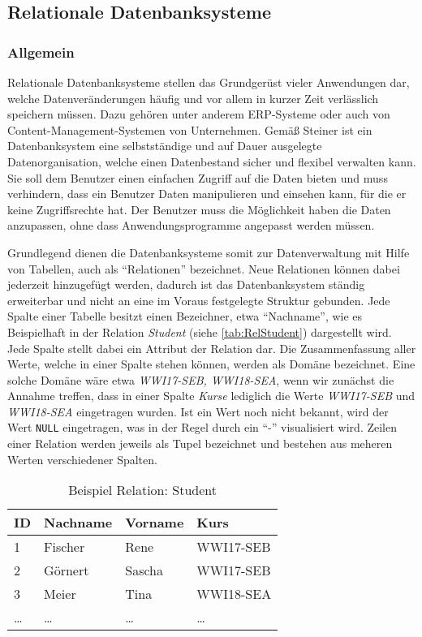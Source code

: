 \subsection{Relationale Datenbanksysteme}

\subsubsection{Allgemein}

Relationale Datenbanksysteme stellen das Grundgerüst vieler Anwendungen dar, welche Datenveränderungen häufig und vor allem in kurzer Zeit verlässlich speichern müssen.
Dazu gehören unter anderem \ac{ERP}-Systeme oder auch von Content-Management-Systemen von Unternehmen.
Gemäß Steiner ist ein Datenbanksystem eine selbstständige und auf Dauer ausgelegte Datenorganisation, welche einen Datenbestand sicher und flexibel verwalten kann.
Sie soll dem Benutzer einen einfachen Zugriff auf die Daten bieten und muss verhindern, dass ein Benutzer Daten manipulieren und einsehen kann, für die er keine Zugriffsrechte hat.
Der Benutzer muss die Möglichkeit haben die Daten anzupassen, ohne dass Anwendungsprogramme angepasst werden müssen.\autocite[Vgl.][S.5 f.]{Book_DB_2}

Grundlegend dienen die Datenbanksysteme somit zur Datenverwaltung mit Hilfe von Tabellen, auch als \enquote{Relationen} bezeichnet.
Neue Relationen können dabei jederzeit hinzugefügt werden, dadurch ist das Datenbanksystem ständig erweiterbar und nicht an eine im Voraus festgelegte Struktur gebunden.
Jede Spalte einer Tabelle besitzt einen Bezeichner, etwa \enquote{Nachname}, wie es Beispielhaft in der Relation \emph{Student} (siehe \vref{tab:RelStudent}) dargestellt wird.
Jede Spalte stellt dabei ein Attribut der Relation dar.
Die Zusammenfassung aller Werte, welche in einer Spalte stehen können, werden als Domäne bezeichnet.
Eine solche Domäne wäre etwa \emph{WWI17-SEB, WWI18-SEA}, wenn wir zunächst die Annahme treffen, dass in einer Spalte \emph{Kurse} lediglich die Werte \emph{WWI17-SEB} und \emph{WWI18-SEA} eingetragen wurden.
Ist ein Wert noch nicht bekannt, wird der Wert \texttt{NULL} eingetragen, was in der Regel durch ein \enquote{-} visualisiert wird.
Zeilen einer Relation werden jeweils als Tupel bezeichnet und bestehen aus meheren Werten verschiedener Spalten.\autocite[vgl. S.9 ff.][]{Book_DB_2}

\begin{table}
    \centering
    \begin{tabular}[h]{l | l | l | l}
        ID & Nachname & Vorname & Kurs \\ \hline
        1 & Fischer & Rene & WWI17-SEB \\
        2 & Görnert & Sascha & WWI17-SEB \\
        3 & Meier & Tina & WWI18-SEA \\
        \dots & \dots & \dots & \dots \\
        \end{tabular}
        \caption{Beispiel Relation: Student}
        \label{tab:RelStudent}
\end{table}


